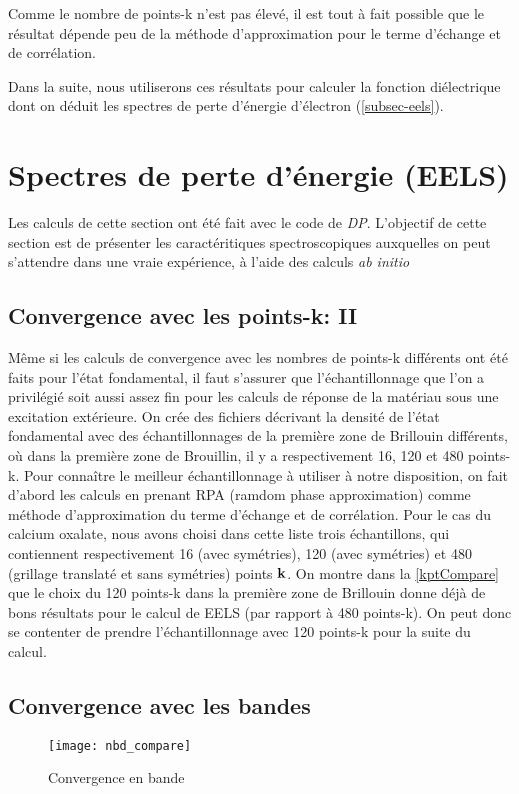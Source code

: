 Comme le nombre de points-k n'est pas élevé,
il est tout à fait possible que le résultat dépende peu de la méthode d'approximation
pour le terme d'échange et de corrélation.

Dans la suite, nous utiliserons ces résultats pour calculer la fonction diélectrique
dont on déduit les spectres de perte d'énergie d'électron (\cref{subsec-eels}).
\section{Spectres de perte d'énergie (EELS)}
Les calculs de cette section ont été fait avec le code de \textit{DP}.
L'objectif de cette section est de présenter les caractéritiques spectroscopiques
auxquelles on peut s'attendre dans une vraie expérience,
à l'aide des calculs \textit{ab initio}
\subsection{Convergence avec les points-k: II}
Même si les calculs de convergence avec les nombres de points-k différents ont été faits pour l'état fondamental,
il faut s'assurer que l'échantillonnage que l'on a privilégié soit aussi assez fin pour les calculs de réponse de la matériau sous une excitation extérieure.
On crée des fichiers décrivant la densité de l'état fondamental avec des échantillonnages
de la première zone de Brillouin différents,
où dans la première zone de Brouillin, il y a respectivement 16, 120 et 480 points-k.
Pour connaître le meilleur échantillonnage à utiliser à notre disposition,
on fait d'abord les calculs en prenant RPA (ramdom phase approximation)
comme méthode d'approximation du terme d'échange et de corrélation.
Pour le cas du calcium oxalate, nous avons choisi dans cette liste trois échantillons,
qui contiennent respectivement 16 (avec symétries),
120 (avec symétries) et 480 (grillage translaté et sans symétries) points $\vb{k}$.
On montre dans la \cref{kptCompare} que le choix du 120 points-k dans la première zone de Brillouin
donne déjà de bons résultats pour le calcul de EELS (par rapport à 480 points-k).
On peut donc se contenter de prendre l'échantillonnage avec 120 points-k pour la suite du calcul.

\subsection{Convergence avec les bandes}

\begin{figure}[!h]\label{fig-cv_nbd}
    \centering
    \texttt{[image: nbd\_compare]}
    \caption{Convergence en bande}
\end{figure}

